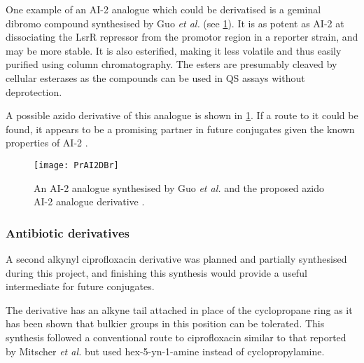 One example of an AI-2 analogue which could be derivatised is a geminal dibromo compound  synthesised by Guo \textit{et al.}\cite{Guo2015} (see \ref{fgr:PrAI2DBr}). It is as potent as AI-2 at dissociating the LsrR repressor from the promotor region in a reporter strain, and may be more stable. It is also esterified, making it less volatile and thus easily purified using column chromatography. The esters are presumably cleaved by cellular esterases as the compounds can be used in QS assays without deprotection\cite{Guo2012}.

A possible azido derivative  of this analogue is shown in \ref{fgr:PrAI2DBr}. If a route to it could be found, it appears to be a promising partner in future conjugates given the known properties of AI-2 .

\begin{figure}[H]
	\begin{center}
		\texttt{[image: PrAI2DBr]}
		\caption{An AI-2 analogue  synthesised by Guo \textit{et al.} and the proposed azido AI-2 analogue derivative .
		\label{fgr:PrAI2DBr}} 
	\end{center}
\end{figure}





\subsubsection{Antibiotic derivatives}


A second alkynyl ciprofloxacin derivative  was planned and partially synthesised during this project, and finishing this synthesis would provide a useful intermediate for future conjugates.

The derivative  has an alkyne tail attached in place of the cyclopropane ring as it has been shown that bulkier groups in this position can be tolerated\cite{Mitscher1986,Chu1985}. This synthesis followed a conventional route to ciprofloxacin  similar to that reported by Mitscher \textit{et al.}\cite{Mitscher1986} but used hex-5-yn-1-amine  instead of cyclopropylamine.

